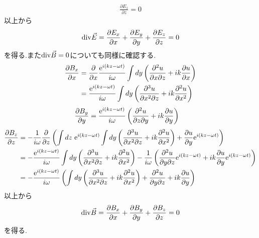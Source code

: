 \documentclass[uplatex,a4j,11pt,dvipdfmx]{jsarticle}
\numberwithin{equation}{section}
\begin{document}
\begin{align}
  \frac{\partial E_z}{\partial z}=0
\end{align}
以上から
\begin{align}
  {\rm div}\vec{E}=\frac{\partial E_x}{\partial x}+\frac{\partial E_y}{\partial y}+\frac{\partial E_z}{\partial z}=0
\end{align}
を得る.また${\rm div}\vec{B}=0$についても同様に確認する.
\begin{align}
  \begin{split}
    \frac{\partial B_x}{\partial x}&=\frac{\partial}{\partial x}\frac{{\rm e}^{i(kz-\omega t)}}{i\omega}\int dy\left(\frac{\partial^2u}{\partial x\partial z}+ik\frac{\partial u}{\partial x}\right)\\
    &=\frac{{\rm e}^{i(kz-\omega t)}}{i\omega}\int dy\left(\frac{\partial^3u}{\partial x^2\partial z}+ik\frac{\partial^2 u}{\partial x^2}\right)
  \end{split}
\end{align}
\begin{align}
  \begin{split}
    \frac{\partial B_y}{\partial y}&=\frac{{\rm e}^{i(kz-\omega t)}}{i\omega}\left(\frac{\partial^2 u}{\partial z\partial y}+ik\frac{\partial u}{\partial y}\right)
  \end{split}
\end{align}
\begin{align}
  \begin{split}
    \frac{\partial B_z}{\partial z}&=-\frac{1}{i\omega}\frac{\partial}{\partial z}\left(\int dz\ {\rm e}^{i(kz-\omega t)}\int dy\left(
    \frac{\partial^3u}{\partial x^2\partial z}+ik\frac{\partial^2u}{\partial x^2}
    \right)+\frac{\partial u}{\partial y}{\rm e}^{i(kz-\omega t)}\right)\\
    &=-\frac{{\rm e}^{i(kz-\omega t)}}{i\omega}\int dy\left(
    \frac{\partial^3u}{\partial x^2\partial z}+ik\frac{\partial^2u}{\partial x^2}
    \right)
    -\frac{1}{i\omega}\left(
    \frac{\partial^2 u}{\partial y\partial z}{\rm e}^{i(kz-\omega t)}
    +ik\frac{\partial u}{\partial y}{\rm e}^{i(kz-\omega t)}
    \right)\\
    &=-\frac{{\rm e}^{i(kz-\omega t)}}{i\omega}\left(
    \int dy\left(
    \frac{\partial^3u}{\partial x^2\partial z}+ik\frac{\partial^2u}{\partial x^2}
    \right)
    +\frac{\partial^2 u}{\partial y\partial z}+ik\frac{\partial u}{\partial y}
    \right)
  \end{split}
\end{align}
以上から
\begin{align}
  {\rm div}\vec{B}=\frac{\partial B_x}{\partial x}+\frac{\partial B_y}{\partial y}+\frac{\partial B_z}{\partial z}=0
\end{align}
を得る.
\setcounter{section}{4}
\setcounter{equation}{0}
\end{document}
